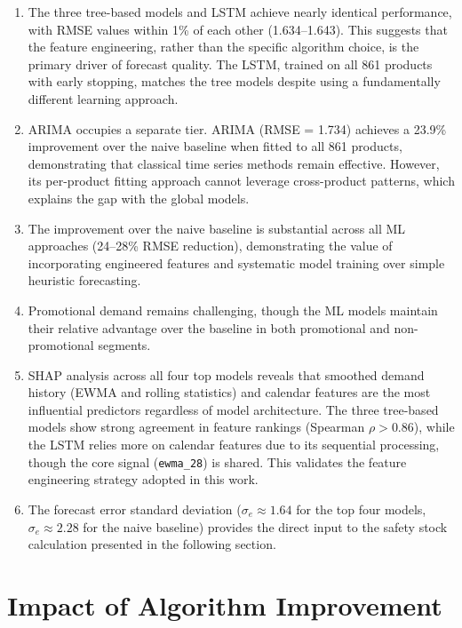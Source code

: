 \begin{enumerate}
    \item The three tree-based models and LSTM achieve nearly identical performance, with RMSE values within 1\% of each other (1.634--1.643). This suggests that the feature engineering, rather than the specific algorithm choice, is the primary driver of forecast quality. The LSTM, trained on all 861 products with early stopping, matches the tree models despite using a fundamentally different learning approach.

    \item ARIMA occupies a separate tier. ARIMA (RMSE = 1.734) achieves a 23.9\% improvement over the naive baseline when fitted to all 861 products, demonstrating that classical time series methods remain effective. However, its per-product fitting approach cannot leverage cross-product patterns, which explains the gap with the global models.

    \item The improvement over the naive baseline is substantial across all ML approaches (24--28\% RMSE reduction), demonstrating the value of incorporating engineered features and systematic model training over simple heuristic forecasting.

    \item Promotional demand remains challenging, though the ML models maintain their relative advantage over the baseline in both promotional and non-promotional segments.

    \item SHAP analysis across all four top models reveals that smoothed demand history (EWMA and rolling statistics) and calendar features are the most influential predictors regardless of model architecture. The three tree-based models show strong agreement in feature rankings (Spearman $\rho > 0.86$), while the LSTM relies more on calendar features due to its sequential processing, though the core signal (\texttt{ewma\_28}) is shared. This validates the feature engineering strategy adopted in this work.

    \item The forecast error standard deviation ($\sigma_e \approx 1.64$ for the top four models, $\sigma_e \approx 2.28$ for the naive baseline) provides the direct input to the safety stock calculation presented in the following section.
\end{enumerate}


\clearpage
\section{Impact of Algorithm Improvement}

